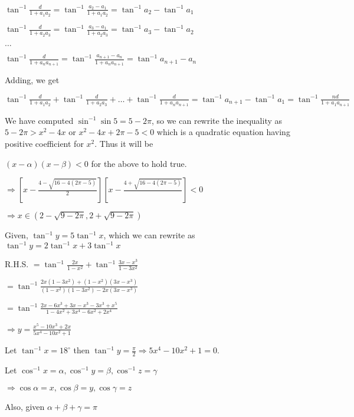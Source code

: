   $\tan^{-1}\frac{d}{1 + a_1a_2} = \tan^{-1}\frac{a_2 - a_1}{1 + a_1a_2} = \tan^{-1}a_2 - \tan^{-1}a_1$

  $\tan^{-1}\frac{d}{1 + a_2a_3} = \tan^{-1}\frac{a_3 - a_1}{1 + a_2a_3} = \tan^{-1}a_3 - \tan^{-1}a_2$

  $\ldots$

  $\tan^{-1}\frac{d}{1 + a_na_{n + 1}} = \tan^{-1}\frac{a_{n + 1} - a_n}{1 + a_na_{n +1}} = \tan^{-1}a_{n + 1} - a_n$

  Adding, we get

  $\tan^{-1}\frac{d}{1 + a_1a_2} + \tan^{-1}\frac{d}{1 + a_2a_3} + \ldots + \tan^{-1}\frac{d}{1 +
    a_na_{n + 1}} = \tan^{-1}a_{n + 1} - \tan^{-1}a_1 = \tan^{-1}\frac{nd}{1 + a_1a_{n + 1}}$

\item We have computed $\sin^{-1}\sin5 = 5-2\pi$, so we can rewrite the inequality as $5 - 2\pi>x^2 - 4x$ or
  $x^2 - 4x + 2\pi - 5 < 0$ which is a quadratic equation having positive coefficient for $x^2$. Thus it will be

  $(x - \alpha)(x - \beta) < 0$ for the above to hold true.

  $\Rightarrow \left[x - \frac{4 - \sqrt{16 - 4(2\pi - 5)}}{2}\right]\left[x - \frac{4 + \sqrt{16 - 4(2\pi - 5)}}{}\right]
  < 0$

  $\Rightarrow x\in (2 - \sqrt{9 - 2\pi}, 2 + \sqrt{9 - 2\pi})$

\item Given, $\tan^{-1}y = 5\tan^{-1}x$, which we can rewrite as $\tan^{-1}y = 2\tan^{-1}x + 3\tan^{-1}x$

  R.H.S. $= \tan^{-1}\frac{2x}{1 - x^2} + \tan^{-1}\frac{3x - x^3}{1 - 3x^2}$

  $= \tan^{-1}\frac{2x(1 - 3x^2) + (1 - x^2)(3x - x^3)}{(1 - x^2)(1 - 3x^2) - 2x(3x - x^3)}$

  $=\tan^{-1}\frac{2x - 6x^3 + 3x - x^3 -3x^3 + x^5}{1 - 4x^2 + 3x^4 - 6x^2 + 2x^4}$

  $\Rightarrow y = \frac{x^5 - 10x^3 + 2x}{5x^4 - 10x^2 + 1}$

  Let $\tan^{-1}x = 18^\circ$ then $\tan^{-1}y = \frac{\pi}{2}\Rightarrow 5x^4 - 10x^2 + 1 = 0$.

\item Let $\cos^{-1}x = \alpha, \cos^{-1}y = \beta, \cos^{-1}z = \gamma$

  $\Rightarrow \cos\alpha = x, \cos\beta = y, \cos\gamma = z$

  Also, given $\alpha + \beta + \gamma = \pi$

